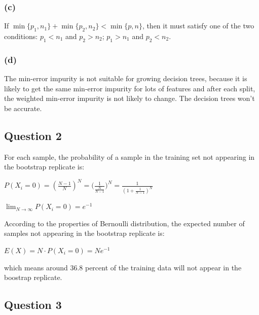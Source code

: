\documentclass[12pt]{article}
\begin{document}
{\subsubsection*{(c)}
If $\min\{p_1, n_1\} + \min\{p_2, n_2\} < \min\{p, n\}$,
then it must satisfy one of the two conditions: 
$p_1 < n_1$ and $p_2 > n_2$;
$p_1 > n_1$ and $p_2 < n_2$.

\subsubsection*{(d)}
The min-error impurity is not suitable for growing decision trees, because it is likely to get the same min-error impurity for lots of features and after each split, the weighted min-error impurity is not likely to change. The decision trees won't be accurate.

\subsection*{Question 2}

For each sample, the probability of a sample in the training set not appearing in the bootstrap replicate is: 
\begin{center}
$P(X_{i}=0) =(\frac{N-1}{N})^N  = {(\frac{1}{\frac{N}{N-1}}})^{N}= \frac{1}{  ({1 + \frac{1}{N-1}} )^{N} }$
\end{center}

\begin{center}
$ \lim_{N\to\infty} P(X_{i}=0) = e^{-1}$
\end{center}

According to the properties of Bernoulli distribution, the expected number of samples not appearing in the bootstrap replicate  is: 
\begin{center}
$E(X)= N\cdot P(X_{i}=0) = Ne^{-1} $
\end{center}

which means around 36.8 percent of the training data will not appear in the boostrap replicate. 

\subsection*{Question 3}
}
\end{document}
